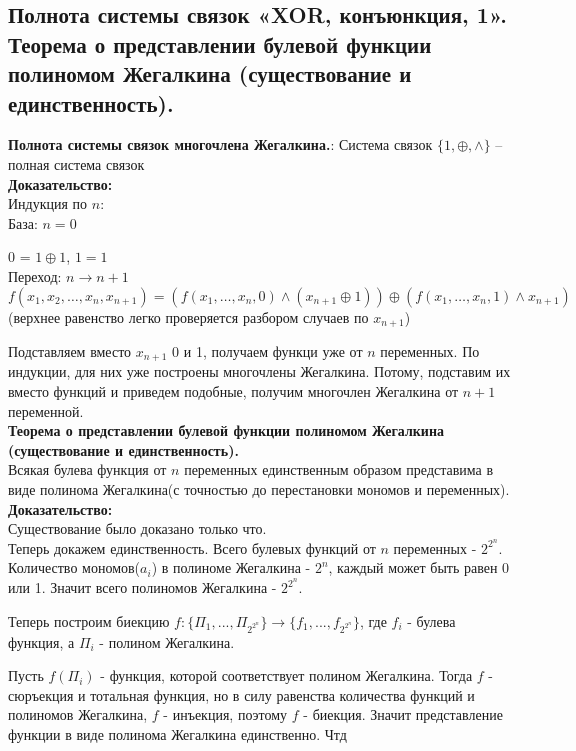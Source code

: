 \subsection{Полнота системы связок «XOR, конъюнкция, 1». Теорема о представлении булевой функции полиномом Жегалкина (существование и единственность).}
\textbf{Полнота системы связок многочлена Жегалкина.}: Система связок $\{1, \oplus, \wedge\}$ -- полная система связок\\

\noindent \textbf{Доказательство:}\\

Индукция по $n$:\\

База: $n = 0$ 

0 = $1 \oplus 1$, $1 = 1$\\

Переход: $n \rightarrow n + 1$\\

$f(x_1,x_2,\ldots,x_n,x_{n+1}) = (f(x_1,\ldots,x_n,0) \wedge (x_{n+1} \oplus 1)) \oplus (f(x_1, \ldots, x_n, 1) \wedge x_{n+1})$\\

(верхнее равенство легко проверяется разбором случаев по $x_{n + 1}$)

Подставляем вместо $x_{n+1}$ 0 и 1, получаем функци уже от $n$ переменных. По индукции, для них уже построены многочлены Жегалкина. Потому, подставим их вместо функций и приведем подобные, получим многочлен Жегалкина от $n + 1$ переменной.\\

\textbf{Теорема о представлении булевой функции полиномом Жегалкина (существование и единственность).}\\

Всякая булева функция от $n$ переменных единственным образом представима в виде полинома Жегалкина(с точностью до перестановки мономов и переменных).\\

\noindent \textbf{Доказательство:}\\

Существование было доказано только что.\\

Теперь докажем единственность. Всего булевых функций от $n$ переменных - $2^{2^n}$. Количество мономов($a_i$) в полиноме Жегалкина - $2^n$, каждый
может быть равен 0 или 1. Значит всего полиномов Жегалкина - $2^{2^n}$.

Теперь построим биекцию $f : \{\Pi_1, ..., \Pi_{2^{2^n}} \} \to \{f_1, ..., f_{2^{2^n}}\}$, где $f_i$ - булева функция, а $\Pi_i$ - полином Жегалкина.

Пусть $f(\Pi_i)$ - функция, которой соответствует полином Жегалкина. Тогда $f$ - сюръекция и тотальная функция, но в силу равенства количества
функций и полиномов Жегалкина, $f$ - инъекция, поэтому $f$ - биекция. Значит представление функции в виде полинома Жегалкина единственно. Чтд
